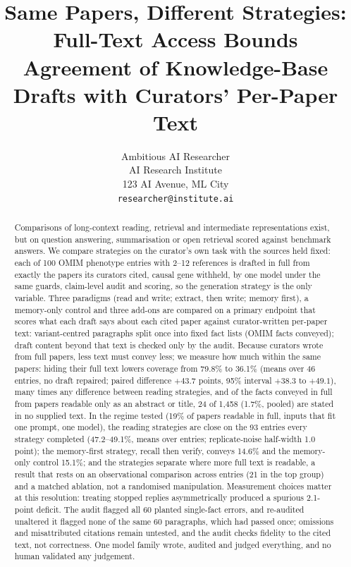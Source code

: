\documentclass{article} %
\title{Same Papers, Different Strategies: Full-Text Access Bounds Agreement of Knowledge-Base Drafts with Curators' Per-Paper Text}
\author{Ambitious AI Researcher\\
AI Research Institute\\
123 AI Avenue, ML City\\
\texttt{researcher@institute.ai}
}
\begin{document}
\maketitle


\begin{abstract}
Comparisons of long-context reading, retrieval and intermediate representations exist, but on question answering, summarisation or open retrieval scored against benchmark answers. We compare strategies on the curator's own task with the sources held fixed: each of 100 OMIM phenotype entries with 2--12 references is drafted in full from exactly the papers its curators cited, causal gene withheld, by one model under the same guards, claim-level audit and scoring, so the generation strategy is the only variable. Three paradigms (read and write; extract, then write; memory first), a memory-only control and three add-ons are compared on a primary endpoint that scores what each draft says about each cited paper against curator-written per-paper text: variant-centred paragraphs split once into fixed fact lists (OMIM facts conveyed); draft content beyond that text is checked only by the audit. Because curators wrote from full papers, less text must convey less; we measure how much within the same papers: hiding their full text lowers coverage from 79.8\% to 36.1\% (means over 46 entries, no draft repaired; paired difference $+43.7$ points, 95\% interval $+38.3$ to $+49.1$), many times any difference between reading strategies, and of the facts conveyed in full from papers readable only as an abstract or title, 24 of 1,458 (1.7\%, pooled) are stated in no supplied text. In the regime tested (19\% of papers readable in full, inputs that fit one prompt, one model), the reading strategies are close on the 93 entries every strategy completed (47.2--49.1\%, means over entries; replicate-noise half-width 1.0 point); the memory-first strategy, recall then verify, conveys 14.6\% and the memory-only control 15.1\%; and the strategies separate where more full text is readable, a result that rests on an observational comparison across entries (21 in the top group) and a matched ablation, not a randomised manipulation. Measurement choices matter at this resolution: treating stopped replies asymmetrically produced a spurious 2.1-point deficit. The audit flagged all 60 planted single-fact errors, and re-audited unaltered it flagged none of the same 60 paragraphs, which had passed once; omissions and misattributed citations remain untested, and the audit checks fidelity to the cited text, not correctness. One model family wrote, audited and judged everything, and no human validated any judgement.
\end{abstract}
\end{document}
